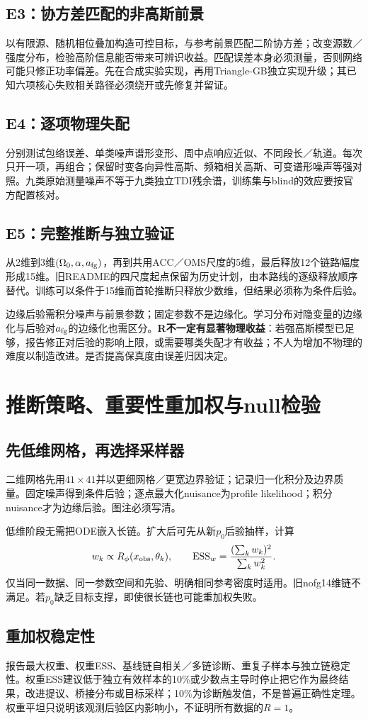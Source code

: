 \documentclass[UTF8,fontset=none,a4paper,11pt]{ctexart}
\begin{document}
\subsection{E3：协方差匹配的非高斯前景}
以有限源、随机相位叠加构造可控目标，与参考前景匹配二阶协方差；改变源数／强度分布，检验高阶信息能否带来可辨识收益。匹配误差本身必须测量，否则网络可能只修正功率偏差。先在合成实验实现，再用Triangle-GB独立实现升级；其已知六项核心失败相关路径必须绕开或先修复并留证。
\subsection{E4：逐项物理失配}
分别测试包络误差、单类噪声谱形变形、周中点响应近似、不同段长／轨道。每次只开一项，再组合；保留时变各向异性高斯、频箱相关高斯、可变谱形噪声等强对照。九类原始测量噪声不等于九类独立TDI残余谱，训练集与blind的效应要按官方配置核对。
\subsection{E5：完整推断与独立验证}
从2维到3维$(\Omega_0,\alpha,a_{\rm fg})$，再到共用ACC／OMS尺度的5维，最后释放12个链路幅度形成15维。旧README的四尺度起点保留为历史计划，由本路线的逐级释放顺序替代。训练可以条件于15维而首轮推断只释放少数维，但结果必须称为条件后验。

边缘后验需积分噪声与前景参数；固定参数不是边缘化。学习分布对隐变量的边缘化与后验对$a_{\rm fg}$的边缘化也需区分。\textbf{R不一定有显著物理收益}：若强高斯模型已足够，报告修正对后验的影响上限，或需要哪类失配才有收益；不人为增加不物理的难度以制造改进。是否提高保真度由误差归因决定。
\clearpage

\section{推断策略、重要性重加权与null检验}
\subsection{先低维网格，再选择采样器}
二维网格先用$41\times41$并以更细网格／更宽边界验证；记录归一化积分及边界质量。固定噪声得到条件后验；逐点最大化nuisance为profile likelihood；积分nuisance才为边缘后验。图注必须写清。

低维阶段无需把ODE嵌入长链。扩大后可先从新$p_0$后验抽样，计算
\[
w_k\propto R_\phi(x_{\rm obs},\theta_k),\qquad
\mathrm{ESS}_w=\frac{(\sum_kw_k)^2}{\sum_kw_k^2}.
\]
仅当同一数据、同一参数空间和先验、明确相同参考密度时适用。旧nofg14维链不满足。若$p_0$缺乏目标支撑，即使很长链也可能重加权失败。
\subsection{重加权稳定性}
报告最大权重、权重ESS、基线链自相关／多链诊断、重复子样本与独立链稳定性。权重ESS建议低于独立有效样本的10\%或少数点主导时停止把它作为最终结果，改进提议、桥接分布或目标采样；10\%为诊断触发值，不是普遍正确性定理。权重平坦只说明该观测后验区内影响小，不证明所有数据的$R=1$。
\end{document}
